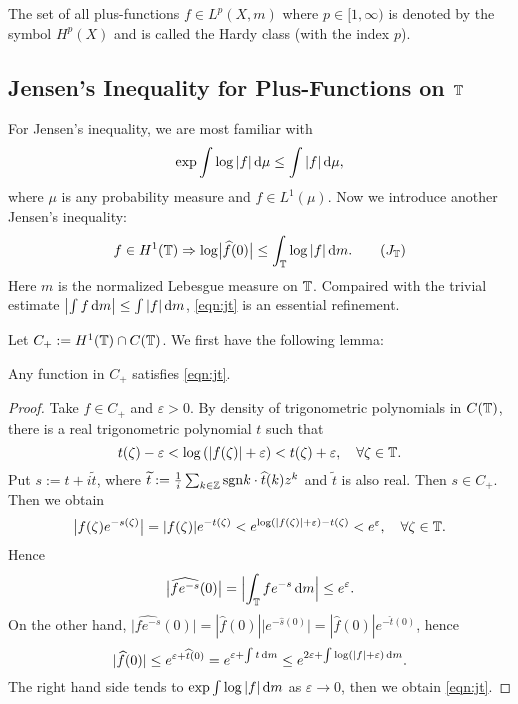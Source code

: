 \begin{definition}
	The set of all plus-functions $f\in L^{p}(X,m)$ where $p \in [1,\infty)$ is denoted by the symbol $H^{p}(X)$ and is called the Hardy class (with the index $p$).
\end{definition}

\subsection{Jensen's Inequality for Plus-Functions on $\mathbb{T}$} 

For Jensen's inequality, we are most familiar with
\[
\exp \int \log |f| \,\mathrm{d} \mu\le \int |f|\,\mathrm{d} \mu,
\] 
where $\mu$ is any probability measure and $f\in L^{1}(\mu)$.
Now we introduce another Jensen's inequality:
\begin{equation}\label{eqn:jt}
	f \in H^{1}(\T)\Rightarrow \log \bigl| \widehat{f}(0) \bigr| \le \int_{\T}\log |f|\d m.\tag{$J_{\T}$}
\end{equation}
Here $m$ is the normalized Lebesgue measure on $\mathbb{T}$. Compaired with the trivial estimate $\bigl| \int f \,\mathrm{d} m \bigr|\le \int |f|\,\mathrm{d} m$, \cref{eqn:jt} is an essential refinement.

Let $C_{+}:=H^{1}(\mathbb{T})\cap C(\mathbb{T})$. We first have the following lemma:
\begin{lemma}
	Any function in $C_{+}$ satisfies \cref{eqn:jt}.
\end{lemma}
\begin{proof}
	Take $f\in C_{+}$ and $\varepsilon >0$. By density of trigonometric polynomials in $C(\mathbb{T})$, there is a real trigonometric polynomial $t$ such that 
	 \[
	t(\zeta )-\varepsilon <\log\left( |f(\zeta )|+\varepsilon  \right) <t(\zeta )+\varepsilon, \quad \forall \zeta  \in  \mathbb{T}.
	\] 
	Put $s:= t+i \widetilde{t}$, where $\widetilde{t}:=\frac{1}{i}\sum_{k\in \mathbb{Z}}^{} \mathrm{sgn} k\cdot \widehat{t}(k)z^{k}$ and $\widetilde{t}$ is also real. Then $s \in C_{+}$. Then we obtain
	\[
	\bigl| f(\zeta )e^{-s(\zeta )}\bigr|=|f(\zeta )|e^{-t(\zeta )}< e^{\log(|f(\zeta )|+\varepsilon )-t(\zeta )}<e^{\varepsilon },\quad \forall \zeta \in \mathbb{T}. 
	\]
	Hence
	\[
	\bigl|\widehat{f e^{-s}}(0)\bigr|=\Bigl| \int_{\mathbb{T}} fe^{-s}\,\mathrm{d} m \Bigr|\le e^{\varepsilon }.
	\] 
	On the other hand, $\bigl|\widehat{fe^{-s}}(0)\bigr|=|\widehat{f}(0)|\bigl|e^{-\widehat{s}(0)}\bigr|=|\widehat{f}(0)|e^{-\widehat{t}(0)}$, hence
	\[
		|\widehat{f}(0)|\le e^{\varepsilon +\widehat{t}(0)} =e^{\varepsilon +\int t\,\mathrm{d} m}\le e^{2\varepsilon +\int \log(|f|+\varepsilon )\,\mathrm{d} m}. 
	\] 
	The right hand side tends to $\exp \int \log |f|\,\mathrm{d} m$ as $\varepsilon \to 0$, then we obtain \cref{eqn:jt}.
\end{proof}

